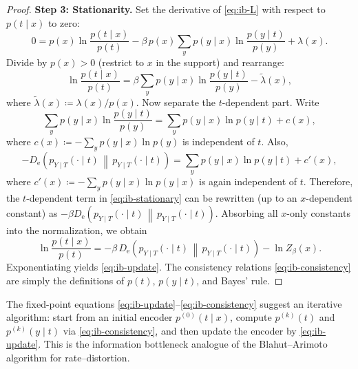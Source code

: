 \documentclass{article}
\numberwithin{equation}{section}
\newcommand{\KLnat}[2]{D_{\mathrm{e}}\!\left(#2\,\middle\|\,#2\right)}
\begin{document}
\begin{proof}
\textbf{Step 3: Stationarity.}
Set the derivative of \eqref{eq:ib-L} with respect to $p(t\mid x)$ to zero:
\begin{equation}
    0 = p(x)\ln\frac{p(t\mid x)}{p(t)}
        - \beta\,p(x)\sum_y p(y\mid x)\ln\frac{p(y\mid t)}{p(y)}
        + \lambda(x).
\end{equation}
Divide by $p(x)>0$ (restrict to $x$ in the support) and rearrange:
\begin{equation}
\label{eq:ib-stationary}
    \ln\frac{p(t\mid x)}{p(t)}
    = \beta\sum_y p(y\mid x)\ln\frac{p(y\mid t)}{p(y)} - \tilde\lambda(x),
\end{equation}
where $\tilde\lambda(x)\coloneqq \lambda(x)/p(x)$.
Now separate the $t$-dependent part.
Write
\begin{equation}
    \sum_y p(y\mid x)\ln\frac{p(y\mid t)}{p(y)}
    = \sum_y p(y\mid x)\ln p(y\mid t) + c(x),
\end{equation}
where $c(x)\coloneqq -\sum_y p(y\mid x)\ln p(y)$ is independent of $t$.
Also,
\begin{equation}
    -\KLnat{p_{Y\mid X}(\cdot\mid x)}{p_{Y\mid T}(\cdot\mid t)}
    = \sum_y p(y\mid x)\ln p(y\mid t) + c'(x),
\end{equation}
where $c'(x)\coloneqq -\sum_y p(y\mid x)\ln p(y\mid x)$ is again independent of $t$.
Therefore, the $t$-dependent term in \eqref{eq:ib-stationary} can be rewritten (up to an $x$-dependent constant) as
\(-\beta\KLnat{p_{Y\mid X}(\cdot\mid x)}{p_{Y\mid T}(\cdot\mid t)}\).
Absorbing all $x$-only constants into the normalization, we obtain
\begin{equation}
    \ln\frac{p(t\mid x)}{p(t)} = -\beta\,\KLnat{p_{Y\mid X}(\cdot\mid x)}{p_{Y\mid T}(\cdot\mid t)} - \ln Z_\beta(x).
\end{equation}
Exponentiating yields \eqref{eq:ib-update}.
The consistency relations \eqref{eq:ib-consistency} are simply the definitions of $p(t)$, $p(y\mid t)$, and Bayes' rule.
\end{proof}

\begin{remark}[IB algorithm]
The fixed-point equations \eqref{eq:ib-update}--\eqref{eq:ib-consistency} suggest an iterative algorithm:
start from an initial encoder $p^{(0)}(t\mid x)$, compute $p^{(k)}(t)$ and $p^{(k)}(y\mid t)$ via \eqref{eq:ib-consistency}, and then update the encoder by \eqref{eq:ib-update}.
This is the information bottleneck analogue of the Blahut--Arimoto algorithm for rate--distortion.
\end{remark}
\end{document}
